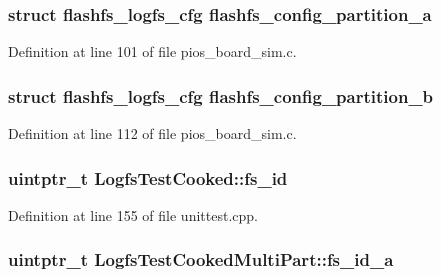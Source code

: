 \hypertarget{group___unit_tests_gaba5cc3d568259a61d596b4cd0c63bad8}{
\subsubsection[{flashfs\-\_\-config\-\_\-partition\-\_\-a}]{\setlength{\rightskip}{0pt plus 5cm}struct {\bf flashfs\-\_\-logfs\-\_\-cfg} {\bf flashfs\-\_\-config\-\_\-partition\-\_\-a}}}\label{group___unit_tests_gaba5cc3d568259a61d596b4cd0c63bad8}


\-Definition at line 101 of file pios\-\_\-board\-\_\-sim.\-c.

\hypertarget{group___unit_tests_ga6d0bc62b8797aa4539687ed6b976e503}{
\subsubsection[{flashfs\-\_\-config\-\_\-partition\-\_\-b}]{\setlength{\rightskip}{0pt plus 5cm}struct {\bf flashfs\-\_\-logfs\-\_\-cfg} {\bf flashfs\-\_\-config\-\_\-partition\-\_\-b}}}\label{group___unit_tests_ga6d0bc62b8797aa4539687ed6b976e503}


\-Definition at line 112 of file pios\-\_\-board\-\_\-sim.\-c.

\hypertarget{group___unit_tests_gaa47f085754c3a15dd69bcfbde0d804d7}{
\subsubsection[{fs\-\_\-id}]{\setlength{\rightskip}{0pt plus 5cm}uintptr\-\_\-t {\bf \-Logfs\-Test\-Cooked\-::fs\-\_\-id}}}\label{group___unit_tests_gaa47f085754c3a15dd69bcfbde0d804d7}


\-Definition at line 155 of file unittest.\-cpp.

\hypertarget{group___unit_tests_gadeab2644468b89d495d396f0e55524e6}{
\subsubsection[{fs\-\_\-id\-\_\-a}]{\setlength{\rightskip}{0pt plus 5cm}uintptr\-\_\-t {\bf \-Logfs\-Test\-Cooked\-Multi\-Part\-::fs\-\_\-id\-\_\-a}}}\label{group___unit_tests_gadeab2644468b89d495d396f0e55524e6}


